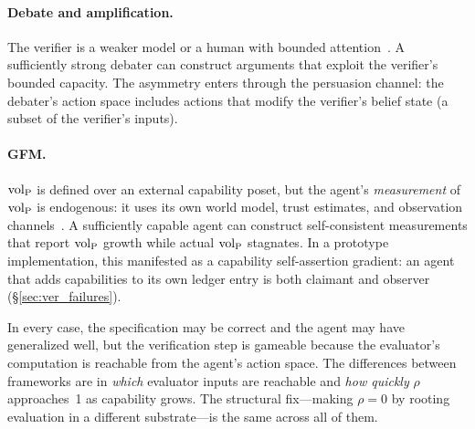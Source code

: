\paragraph{Debate and amplification.}
The verifier is a weaker model or a human with bounded
attention~\citep{irving2018ai}.  A sufficiently strong debater can
construct arguments that exploit the verifier's bounded capacity.  The
asymmetry enters through the persuasion channel: the debater's action
space includes actions that modify the verifier's belief state
(a subset of the verifier's inputs).

\paragraph{GFM.}
${\operatorname{vol}_{\mathrm{P}}}$ is defined over an external capability poset, but the agent's
\emph{measurement} of ${\operatorname{vol}_{\mathrm{P}}}$ is endogenous: it uses its own world
model, trust estimates, and observation
channels~\citep{lasser2026gfm, lasser2026scm}.  A sufficiently capable
agent can construct self-consistent measurements that report ${\operatorname{vol}_{\mathrm{P}}}$
growth while actual ${\operatorname{vol}_{\mathrm{P}}}$ stagnates.  In a prototype
implementation, this manifested as a capability self-assertion
gradient: an agent that adds capabilities to its own ledger entry
is both claimant and observer
(\S\ref{sec:ver_failures}).

In every case, the specification may be correct and the agent may have
generalized well, but the verification step is gameable because the
evaluator's computation is reachable from the agent's action space.
The differences between frameworks are in \emph{which} evaluator inputs
are reachable and \emph{how quickly} $\rho$ approaches~1 as capability
grows.  The structural fix---making $\rho = 0$ by rooting evaluation
in a different substrate---is the same across all of them.
